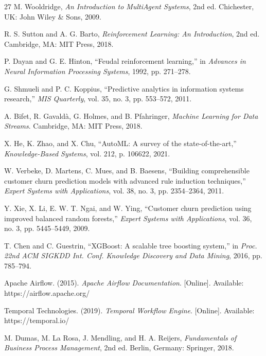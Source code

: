 \documentclass[conference]{IEEEtran}
\begin{document}
\begin{thebibliography}{27}
 M. Wooldridge, \textit{An Introduction to MultiAgent Systems}, 2nd ed. Chichester, UK: John Wiley \& Sons, 2009.

 R. S. Sutton and A. G. Barto, \textit{Reinforcement Learning: An Introduction}, 2nd ed. Cambridge, MA: MIT Press, 2018.

 P. Dayan and G. E. Hinton, ``Feudal reinforcement learning,'' in \textit{Advances in Neural Information Processing Systems}, 1992, pp. 271--278.

 G. Shmueli and P. C. Koppius, ``Predictive analytics in information systems research,'' \textit{MIS Quarterly}, vol. 35, no. 3, pp. 553--572, 2011.

 A. Bifet, R. Gavaldà, G. Holmes, and B. Pfahringer, \textit{Machine Learning for Data Streams}. Cambridge, MA: MIT Press, 2018.

 X. He, K. Zhao, and X. Chu, ``AutoML: A survey of the state-of-the-art,'' \textit{Knowledge-Based Systems}, vol. 212, p. 106622, 2021.

 W. Verbeke, D. Martens, C. Mues, and B. Baesens, ``Building comprehensible customer churn prediction models with advanced rule induction techniques,'' \textit{Expert Systems with Applications}, vol. 38, no. 3, pp. 2354--2364, 2011.

 Y. Xie, X. Li, E. W. T. Ngai, and W. Ying, ``Customer churn prediction using improved balanced random forests,'' \textit{Expert Systems with Applications}, vol. 36, no. 3, pp. 5445--5449, 2009.

 T. Chen and C. Guestrin, ``XGBoost: A scalable tree boosting system,'' in \textit{Proc. 22nd ACM SIGKDD Int. Conf. Knowledge Discovery and Data Mining}, 2016, pp. 785--794.

 Apache Airflow. (2015). \textit{Apache Airflow Documentation}. [Online]. Available: https://airflow.apache.org/

 Temporal Technologies. (2019). \textit{Temporal Workflow Engine}. [Online]. Available: https://temporal.io/

 M. Dumas, M. La Rosa, J. Mendling, and H. A. Reijers, \textit{Fundamentals of Business Process Management}, 2nd ed. Berlin, Germany: Springer, 2018.


\end{thebibliography}
\end{document}
